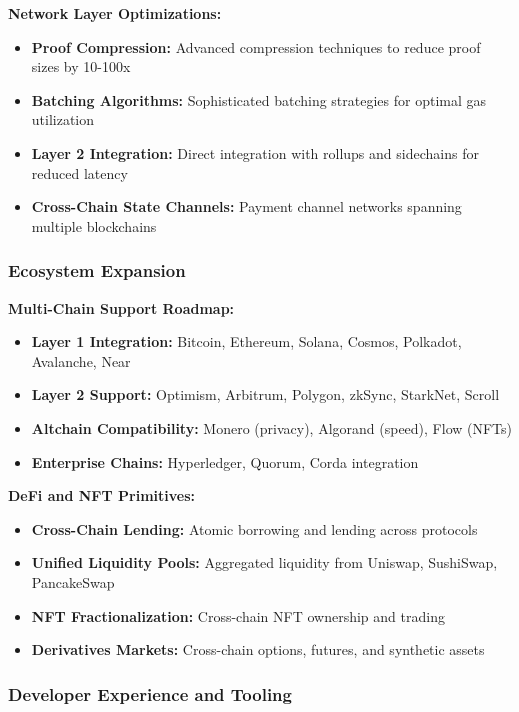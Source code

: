 \documentclass[11pt,a4paper]{article}
\begin{document}
\textbf{Network Layer Optimizations:}
\begin{itemize}
    \item \textbf{Proof Compression:} Advanced compression techniques to reduce proof sizes by 10-100x
    \item \textbf{Batching Algorithms:} Sophisticated batching strategies for optimal gas utilization
    \item \textbf{Layer 2 Integration:} Direct integration with rollups and sidechains for reduced latency
    \item \textbf{Cross-Chain State Channels:} Payment channel networks spanning multiple blockchains
\end{itemize}

\subsubsection{Ecosystem Expansion}

\textbf{Multi-Chain Support Roadmap:}
\begin{itemize}
    \item \textbf{Layer 1 Integration:} Bitcoin, Ethereum, Solana, Cosmos, Polkadot, Avalanche, Near
    \item \textbf{Layer 2 Support:} Optimism, Arbitrum, Polygon, zkSync, StarkNet, Scroll
    \item \textbf{Altchain Compatibility:} Monero (privacy), Algorand (speed), Flow (NFTs)
    \item \textbf{Enterprise Chains:} Hyperledger, Quorum, Corda integration
\end{itemize}

\textbf{DeFi and NFT Primitives:}
\begin{itemize}
    \item \textbf{Cross-Chain Lending:} Atomic borrowing and lending across protocols
    \item \textbf{Unified Liquidity Pools:} Aggregated liquidity from Uniswap, SushiSwap, PancakeSwap
    \item \textbf{NFT Fractionalization:} Cross-chain NFT ownership and trading
    \item \textbf{Derivatives Markets:} Cross-chain options, futures, and synthetic assets
\end{itemize}

\subsubsection{Developer Experience and Tooling}
\end{document}
